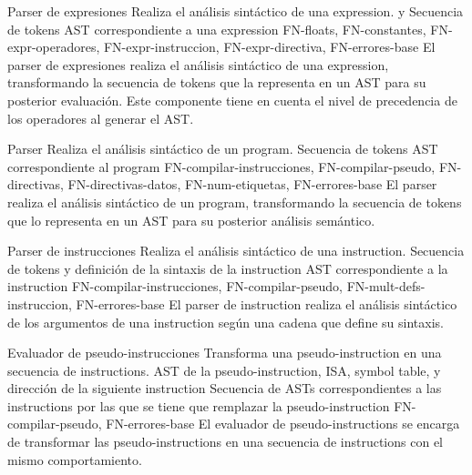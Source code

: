 \begin{component}{Parser de expresiones}
    {Realiza el análisis sintáctico de una \gls{expression}.} %
    { y } %
    {Secuencia de \glspl{token}} %
    {\gls{AST} correspondiente a una \gls{expression}} %
    {FN-floats, FN-constantes, FN-expr-operadores,
    FN-expr-instruccion, FN-expr-directiva, FN-errores-base} %
    El \gls{parser} de expresiones realiza el análisis sintáctico de una
    \gls{expression}, transformando la secuencia de \glspl{token} que la
    representa en un \gls{AST} para su posterior evaluación. Este componente
    tiene en cuenta el nivel de precedencia de los operadores al generar el
    \gls{AST}.
\end{component}

\begin{component}{Parser}
    {Realiza el análisis sintáctico de un \gls{program}.} %
    {} %
    {Secuencia de \glspl{token}} %
    {\gls{AST} correspondiente al \gls{program}} %
    {FN-compilar-instrucciones, FN-compilar-pseudo, FN-directivas,
    FN-directivas-datos, FN-num-etiquetas, FN-errores-base} %
    El \gls{parser} realiza el análisis sintáctico de un \gls{program},
    transformando la secuencia de \glspl{token} que lo representa en un
    \gls{AST} para su posterior análisis semántico.
\end{component}

\begin{component}{Parser de instrucciones}
    {Realiza el análisis sintáctico de una \gls{instruction}.} %
    {} %
    {Secuencia de \glspl{token} y definición de la sintaxis de la \gls{instruction}} %
    {\gls{AST} correspondiente a la \gls{instruction}} %
    {FN-compilar-instrucciones, FN-compilar-pseudo,
    FN-mult-defs-instruccion, FN-errores-base} %
    El \gls{parser} de \gls{instruction} realiza el análisis sintáctico de los
    argumentos de una \gls{instruction} según una cadena que define su sintaxis.
\end{component}

\begin{component}{Evaluador de pseudo-instrucciones}
    {Transforma una \gls{pseudo-instruction} en una secuencia de \glspl{instruction}.} %
    {} %
    {\gls{AST} de la \gls{pseudo-instruction}, \gls{ISA}, \gls{symbol table}, y dirección de la siguiente \gls{instruction}} %
    {Secuencia de \glspl{AST} correspondientes a las \glspl{instruction} por las que se tiene que remplazar la \gls{pseudo-instruction}} %
    {FN-compilar-pseudo, FN-errores-base} %
    El evaluador de \glspl{pseudo-instruction} se encarga de transformar las
    \glspl{pseudo-instruction} en una secuencia de \glspl{instruction} con el
    mismo comportamiento.
\end{component}

